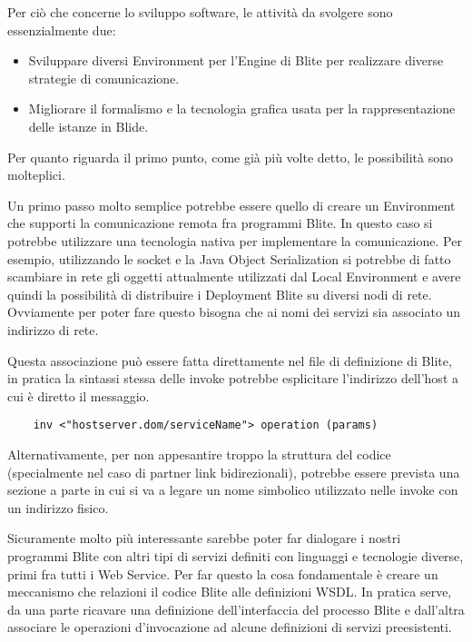 Per ciò che concerne lo sviluppo software, le attività da svolgere sono
essenzialmente due:

\begin{itemize}
  \item Sviluppare diversi Environment per l'Engine di Blite per realizzare
  diverse strategie di comunicazione.
  \item Migliorare il formalismo e la tecnologia grafica usata per la
  rappresentazione delle istanze in Blide.
\end{itemize} 

Per quanto riguarda il primo punto, come già più volte detto, le possibilità
sono molteplici. 

Un primo passo molto semplice potrebbe essere quello di creare un Environment
che supporti la comunicazione remota fra programmi Blite. In questo caso si
potrebbe utilizzare una tecnologia nativa per implementare la comunicazione. Per
esempio, utilizzando le socket e la Java Object Serialization si potrebbe di
fatto scambiare in rete gli oggetti attualmente utilizzati dal Local
Environment e avere quindi la possibilità di
distribuire i Deployment Blite su diversi nodi di rete. Ovviamente per poter
fare questo bisogna che ai nomi dei servizi sia associato un indirizzo di rete.

Questa associazione può essere fatta direttamente nel file di definizione di
Blite, in pratica la sintassi stessa delle invoke potrebbe esplicitare
l'indirizzo dell'host a cui è diretto il messaggio.

\begin{verbatim}
    inv <"hostserver.dom/serviceName"> operation (params) 
\end{verbatim}

Alternativamente, per non appesantire troppo la struttura del codice
(specialmente nel caso di partner link bidirezionali), potrebbe essere prevista
una sezione a parte in cui si va a legare un nome simbolico utilizzato nelle invoke con un
indirizzo fisico.

Sicuramente molto più interessante sarebbe poter far dialogare i nostri programmi
Blite con altri tipi di servizi definiti con linguaggi e tecnologie diverse,
primi fra tutti i Web Service. Per far questo la cosa fondamentale è creare
un meccanismo che relazioni il codice Blite alle definizioni WSDL. In pratica
serve, da una parte ricavare una definizione dell'interfaccia del processo
Blite e dall'altra associare le operazioni d'invocazione ad alcune definizioni di
servizi preesistenti.

